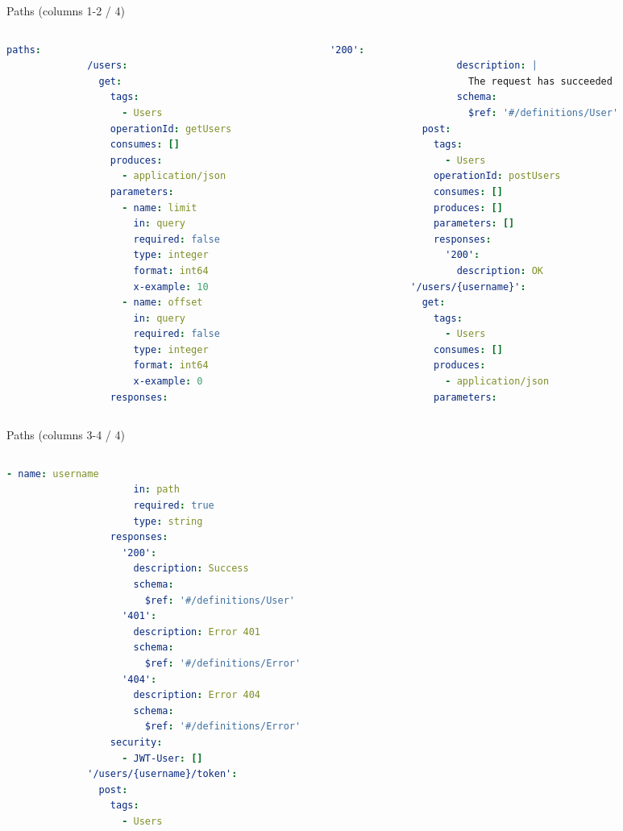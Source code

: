 \begin{frame}
	\begin{exampleblock}{Paths (columns 1-2 / 4)}
		\begin{columns}
		
		\begin{column}{0.48\textwidth}
		\begin{lstlisting}[language=yaml,basicstyle=\tiny]
			paths:
			  /users:
			    get:
			      tags:
			        - Users
			      operationId: getUsers
			      consumes: []
			      produces:
			        - application/json
			      parameters:
			        - name: limit
			          in: query
			          required: false
			          type: integer
			          format: int64
			          x-example: 10
			        - name: offset
			          in: query
			          required: false
			          type: integer
			          format: int64
			          x-example: 0
			      responses:
		\end{lstlisting}
		\end{column}
		
		\begin{column}{0.48\textwidth}
		\begin{lstlisting}[language=yaml,basicstyle=\tiny]
			        '200':
			          description: |
			            The request has succeeded
			          schema:
			            $ref: '#/definitions/User'
			    post:
			      tags:
			        - Users
			      operationId: postUsers
			      consumes: []
			      produces: []
			      parameters: []
			      responses:
			        '200':
			          description: OK
			  '/users/{username}':
			    get:
			      tags:
			        - Users
			      consumes: []
			      produces:
			        - application/json
			      parameters:
		\end{lstlisting}
		\end{column}
		
		\end{columns}
	\end{exampleblock}
	
\begin{exampleblock}{Paths (columns 3-4 / 4)}
		\begin{columns}
		
		\begin{column}{0.48\textwidth}
		\begin{lstlisting}[language=yaml,basicstyle=\tiny]
			        - name: username
			          in: path
			          required: true
			          type: string
			      responses:
			        '200':
			          description: Success
			          schema:
			            $ref: '#/definitions/User'
			        '401':
			          description: Error 401
			          schema:
			            $ref: '#/definitions/Error'
			        '404':
			          description: Error 404
			          schema:
			            $ref: '#/definitions/Error'
			      security: 
			        - JWT-User: []
			  '/users/{username}/token':
			    post:
			      tags:
			        - Users
		\end{lstlisting}
		\end{column}
		

\end{columns}
\end{exampleblock}
\end{frame}

